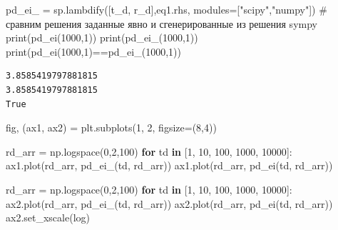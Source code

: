 \documentclass[
  russian,
  letterpaper,
  DIV=11,
  numbers=noendperiod,
  oneside]{scrartcl}
\newenvironment{Shaded}{\begin{snugshade}}{\end{snugshade}}
\newcommand{\BuiltInTok}[1]{\textcolor[rgb]{0.00,0.23,0.31}{#1}}
\newcommand{\CommentTok}[1]{\textcolor[rgb]{0.37,0.37,0.37}{#1}}
\newcommand{\ControlFlowTok}[1]{\textcolor[rgb]{0.00,0.23,0.31}{\textbf{#1}}}
\newcommand{\DecValTok}[1]{\textcolor[rgb]{0.68,0.00,0.00}{#1}}
\newcommand{\KeywordTok}[1]{\textcolor[rgb]{0.00,0.23,0.31}{\textbf{#1}}}
\newcommand{\NormalTok}[1]{\textcolor[rgb]{0.00,0.23,0.31}{#1}}
\newcommand{\OperatorTok}[1]{\textcolor[rgb]{0.37,0.37,0.37}{#1}}
\newcommand{\StringTok}[1]{\textcolor[rgb]{0.13,0.47,0.30}{#1}}
\begin{document}
\begin{Shaded}
\begin{Highlighting}[]
\NormalTok{pd\_ei\_ }\OperatorTok{=}\NormalTok{ sp.lambdify([t\_d, r\_d],eq1.rhs, modules}\OperatorTok{=}\NormalTok{[}\StringTok{"scipy"}\NormalTok{,}\StringTok{"numpy"}\NormalTok{]) }
\CommentTok{\# сравним решения заданные явно и сгенерированные из решения \textasciigrave{}sympy\textasciigrave{}}
\BuiltInTok{print}\NormalTok{(pd\_ei(}\DecValTok{1000}\NormalTok{,}\DecValTok{1}\NormalTok{))}
\BuiltInTok{print}\NormalTok{(pd\_ei\_(}\DecValTok{1000}\NormalTok{,}\DecValTok{1}\NormalTok{))}
\BuiltInTok{print}\NormalTok{(pd\_ei(}\DecValTok{1000}\NormalTok{,}\DecValTok{1}\NormalTok{)}\OperatorTok{==}\NormalTok{pd\_ei\_(}\DecValTok{1000}\NormalTok{,}\DecValTok{1}\NormalTok{))}
\end{Highlighting}
\end{Shaded}

\begin{verbatim}
3.8585419797881815
3.8585419797881815
True
\end{verbatim}

\begin{Shaded}
\begin{Highlighting}[]
\NormalTok{fig, (ax1, ax2) }\OperatorTok{=}\NormalTok{ plt.subplots(}\DecValTok{1}\NormalTok{, }\DecValTok{2}\NormalTok{, figsize}\OperatorTok{=}\NormalTok{(}\DecValTok{8}\NormalTok{,}\DecValTok{4}\NormalTok{))}

\NormalTok{rd\_arr }\OperatorTok{=}\NormalTok{ np.logspace(}\DecValTok{0}\NormalTok{,}\DecValTok{2}\NormalTok{,}\DecValTok{100}\NormalTok{)}
\ControlFlowTok{for}\NormalTok{ td }\KeywordTok{in}\NormalTok{ [}\DecValTok{1}\NormalTok{, }\DecValTok{10}\NormalTok{, }\DecValTok{100}\NormalTok{, }\DecValTok{1000}\NormalTok{, }\DecValTok{10000}\NormalTok{]:}
\NormalTok{    ax1.plot(rd\_arr, pd\_ei\_(td, rd\_arr))}
\NormalTok{    ax1.plot(rd\_arr, pd\_ei(td, rd\_arr))}

\NormalTok{rd\_arr }\OperatorTok{=}\NormalTok{ np.logspace(}\DecValTok{0}\NormalTok{,}\DecValTok{2}\NormalTok{,}\DecValTok{100}\NormalTok{)}
\ControlFlowTok{for}\NormalTok{ td }\KeywordTok{in}\NormalTok{ [}\DecValTok{1}\NormalTok{, }\DecValTok{10}\NormalTok{, }\DecValTok{100}\NormalTok{, }\DecValTok{1000}\NormalTok{, }\DecValTok{10000}\NormalTok{]:}
\NormalTok{    ax2.plot(rd\_arr, pd\_ei\_(td, rd\_arr))}
\NormalTok{    ax2.plot(rd\_arr, pd\_ei(td, rd\_arr))}
\NormalTok{ax2.set\_xscale(}\StringTok{\textquotesingle{}log\textquotesingle{}}\NormalTok{)}
\end{Highlighting}
\end{Shaded}
\end{document}
